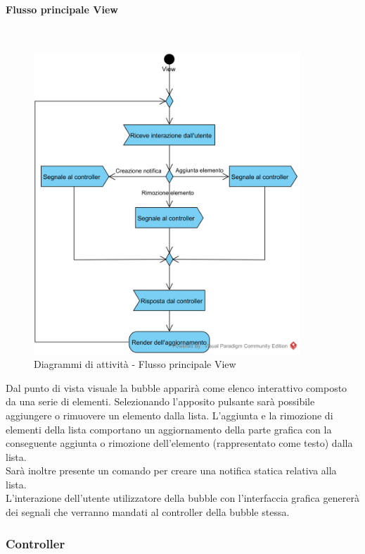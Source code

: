 \paragraph{Flusso principale View}\mbox{}\\
\nopagebreak
\begin{figure}[H]
	\centering
	\includegraphics[width=10cm]{../../documenti/SpecificaTecnica/diagrammi_img/attivita/todo_view.png}
	\caption{Diagrammi di attività - Flusso principale View}
\end{figure}

Dal punto di vista visuale la bubble apparirà come elenco interattivo composto da una serie di elementi. Selezionando l'apposito pulsante sarà possibile aggiungere o rimuovere un elemento dalla lista. L'aggiunta e la rimozione di elementi della lista comportano un aggiornamento della parte grafica con la conseguente aggiunta o rimozione dell'elemento (rappresentato come testo) dalla lista.\\
Sarà inoltre presente un comando per creare una notifica statica relativa alla lista.\\
L'interazione dell'utente utilizzatore della bubble con l'interfaccia grafica genererà dei segnali che verranno mandati al controller della bubble stessa.

\subsubsection{Controller}

